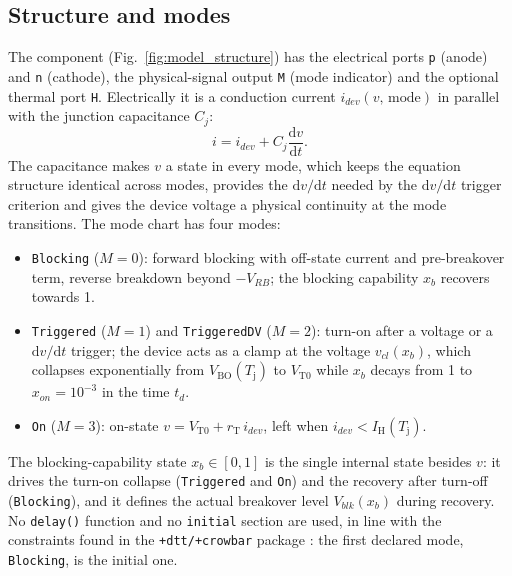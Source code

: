 \documentclass[11pt,a4paper]{article}
\newcommand{\Vbo}{V_{\mathrm{BO}}}
\newcommand{\Ih}{I_{\mathrm{H}}}
\newcommand{\Vto}{V_{\mathrm{T0}}}
\newcommand{\rT}{r_{\mathrm{T}}}
\newcommand{\Tj}{T_{\mathrm{j}}}
\newcommand{\dvdt}{\mathrm{d}v/\mathrm{d}t}
\newcommand{\ssc}[1]{\texttt{#1}}
\begin{document}
\subsection{Structure and modes}
The component (Fig.~\ref{fig:model_structure}) has the electrical ports \ssc{p} (anode) and \ssc{n} (cathode), the physical-signal output \ssc{M} (mode indicator) and the optional thermal port \ssc{H}. Electrically it is a conduction current $i_{dev}(v,\,\text{mode})$ in parallel with the junction capacitance $C_j$:
\begin{equation}
i = i_{dev} + C_j \frac{\mathrm{d}v}{\mathrm{d}t} .
\end{equation}
The capacitance makes $v$ a state in every mode, which keeps the equation structure identical across modes, provides the $\dvdt$ needed by the $\dvdt$ trigger criterion and gives the device voltage a physical continuity at the mode transitions. The mode chart has four modes:
\begin{itemize}
\item \ssc{Blocking} ($M=0$): forward blocking with off-state current and pre-breakover term, reverse breakdown beyond $-V_{RB}$; the blocking capability $x_b$ recovers towards 1.
\item \ssc{Triggered} ($M=1$) and \ssc{TriggeredDV} ($M=2$): turn-on after a voltage or a $\dvdt$ trigger; the device acts as a clamp at the voltage $v_{cl}(x_b)$, which collapses exponentially from $\Vbo(\Tj)$ to $\Vto$ while $x_b$ decays from 1 to $x_{on}=10^{-3}$ in the time $t_d$.
\item \ssc{On} ($M=3$): on-state $v = \Vto + \rT\, i_{dev}$, left when $i_{dev} < \Ih(\Tj)$.
\end{itemize}
The blocking-capability state $x_b\in[0,1]$ is the single internal state besides $v$: it drives the turn-on collapse (\ssc{Triggered} and \ssc{On}) and the recovery after turn-off (\ssc{Blocking}), and it defines the actual breakover level $V_{blk}(x_b)$ during recovery. No \ssc{delay()} function and no \ssc{initial} section are used, in line with the constraints found in the \ssc{+dtt/+crowbar} package \cite{crowbardtt}: the first declared mode, \ssc{Blocking}, is the initial one.
\end{document}
